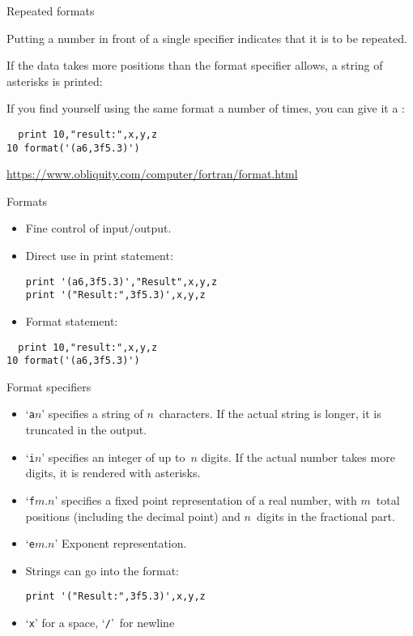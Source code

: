 \begin{slide}{Repeated formats}
  \label{sl:f-format-rep}
\end{slide}

Putting a number in front of a single specifier indicates that it is
to be repeated.

If the data takes more positions than the format specifier allows, a
string of asterisks is printed:
%

If you find yourself using the same format a number of times, you can
give it a :
\begin{lstlisting}
  print 10,"result:",x,y,z
10 format('(a6,3f5.3)')
\end{lstlisting}

\url{https://www.obliquity.com/computer/fortran/format.html}

\begin{slide}{Formats}
  \label{sl:formats}
  \begin{itemize}
  \item
    Fine control of input/output.
  \item
    Direct use in print statement:  
\begin{lstlisting}
print '(a6,3f5.3)',"Result",x,y,z
print '("Result:",3f5.3)',x,y,z
\end{lstlisting}
\item Format statement:
  \end{itemize}
\begin{lstlisting}
  print 10,"result:",x,y,z
10 format('(a6,3f5.3)')
\end{lstlisting}
\end{slide}

\begin{slide}{Format specifiers}
  \label{sl:formatspec}
  \begin{itemize}
  \item `\lstinline{a}$n$' specifies a string of $n$~characters. If the actual
    string is longer, it is truncated in the output.
  \item `\lstinline{i}$n$' specifies an integer of up to~$n$ digits. If the actual
    number takes more digits, it is rendered with asterisks.
  \item `\lstinline{f}$m.n$' specifies a fixed point representation of a real
    number, with $m$~total positions (including the decimal point)
    and $n$~digits in the fractional part.
  \item `\lstinline{e}$m.n$' Exponent representation.
  \item Strings can go into the format:
\begin{lstlisting}
print '("Result:",3f5.3)',x,y,z
\end{lstlisting}
\item `\lstinline{x}' for a space, `\lstinline{/}'~for newline
  \end{itemize}
\end{slide}

